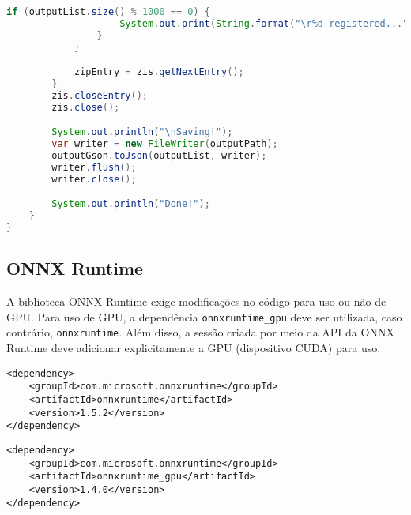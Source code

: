 \begin{lstlisting}[language=Java, caption=Classe principal de execução das medições em Java]
                if (outputList.size() % 1000 == 0) {
                    System.out.print(String.format("\r%d registered...", outputList.size()));
                }
            }

            zipEntry = zis.getNextEntry();
        }
        zis.closeEntry();
        zis.close();

        System.out.println("\nSaving!");
        var writer = new FileWriter(outputPath);
        outputGson.toJson(outputList, writer);
        writer.flush();
        writer.close();

        System.out.println("Done!");
    }
}
\end{lstlisting}

\subsection{ONNX Runtime}

A biblioteca ONNX Runtime exige modificações no código para uso ou não de GPU. Para uso de GPU, a dependência \texttt{onnxruntime\_gpu} deve ser utilizada, caso contrário, \texttt{onnxruntime}. Além disso, a sessão criada por meio da API da ONNX Runtime deve adicionar explicitamente a GPU (dispositivo CUDA) para uso.

\begin{lstlisting}[caption=Dependências Maven para uso de ONNX Runtime sem GPU]
<dependency>
    <groupId>com.microsoft.onnxruntime</groupId>
    <artifactId>onnxruntime</artifactId>
    <version>1.5.2</version>
</dependency>
\end{lstlisting}

\begin{lstlisting}[caption=Dependências Maven para uso de ONNX Runtime com GPU]
<dependency>
    <groupId>com.microsoft.onnxruntime</groupId>
    <artifactId>onnxruntime_gpu</artifactId>
    <version>1.4.0</version>
</dependency>
\end{lstlisting}

